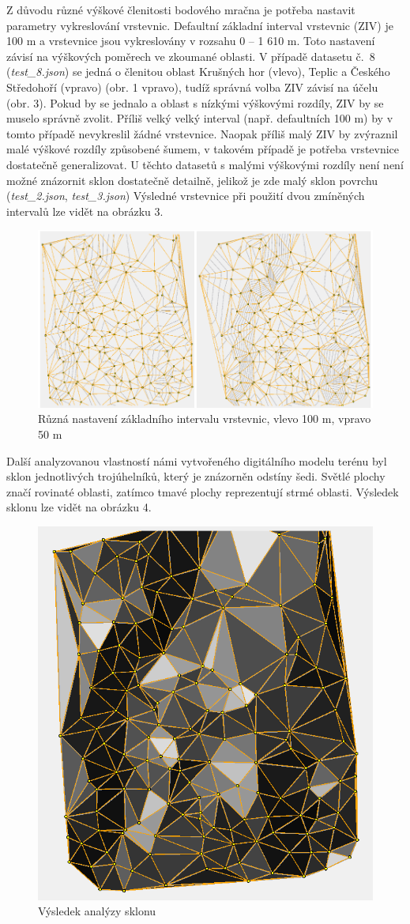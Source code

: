 \documentclass{article}
\begin{document}
\begin{spacing}{1.5}
\newpage
Z důvodu různé výškové členitosti bodového mračna je potřeba nastavit parametry vykreslování vrstevnic. Defaultní základní interval vrstevnic (ZIV) je 100 m a vrstevnice jsou vykreslovány v rozsahu 0 – 1 610 m. Toto nastavení závisí na výškových poměrech ve zkoumané oblasti. V případě datasetu č.~8 (\textit{test\_8.json}) se jedná o členitou oblast Krušných hor (vlevo), Teplic a Českého Středohoří (vpravo) (obr. 1 vpravo), tudíž správná volba ZIV závisí na účelu (obr. 3). Pokud by se jednalo a oblast s nízkými výškovými rozdíly, ZIV by se muselo správně zvolit. Příliš velký velký interval (např. defaultních 100 m) by v tomto případě nevykreslil žádné vrstevnice. Naopak příliš malý ZIV by zvýraznil malé výškové rozdíly způsobené šumem, v takovém případě je potřeba vrstevnice dostatečně generalizovat. U těchto datasetů s malými výškovými rozdíly není není možné znázornit sklon dostatečně detailně, jelikož je zde malý sklon povrchu (\textit{test\_2.json}, \textit{test\_3.json}) Výsledné vrstevnice při použití dvou zmíněných intervalů lze vidět na obrázku 3.

\begin{figure}[htbp]
    \centering
    \includegraphics[width=0.8\linewidth]{images/03vrstevnice.png}
    \caption{Různá nastavení základního intervalu vrstevnic, vlevo 100 m, vpravo 50 m}
    \label{fig:enter-label}
\end{figure}

\newpage
Další analyzovanou vlastností námi vytvořeného digitálního modelu terénu byl sklon jednotlivých trojúhelníků, který je znázorněn odstíny šedi. Světlé plochy značí rovinaté oblasti, zatímco tmavé plochy reprezentují strmé oblasti. Výsledek sklonu lze vidět na obrázku 4. 

\begin{figure}[htbp]
    \centering
    \includegraphics[width=0.4\linewidth]{images/04sklon.png}
    \caption{Výsledek analýzy sklonu}
    \label{fig:enter-label}
\end{figure}


\end{spacing}
\end{document}
